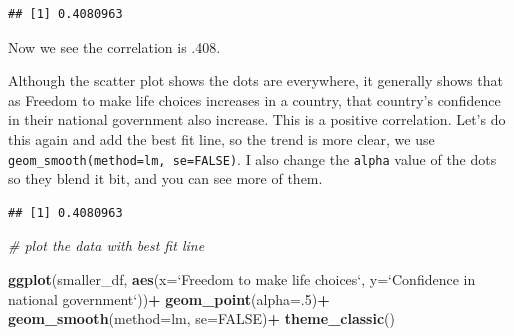 \documentclass[]{book}
\newenvironment{Shaded}{\begin{snugshade}}{\end{snugshade}}
\newcommand{\KeywordTok}[1]{\textcolor[rgb]{0.13,0.29,0.53}{\textbf{#1}}}
\newcommand{\DataTypeTok}[1]{\textcolor[rgb]{0.13,0.29,0.53}{#1}}
\newcommand{\DecValTok}[1]{\textcolor[rgb]{0.00,0.00,0.81}{#1}}
\newcommand{\StringTok}[1]{\textcolor[rgb]{0.31,0.60,0.02}{#1}}
\newcommand{\CommentTok}[1]{\textcolor[rgb]{0.56,0.35,0.01}{\textit{#1}}}
\newcommand{\OtherTok}[1]{\textcolor[rgb]{0.56,0.35,0.01}{#1}}
\newcommand{\OperatorTok}[1]{\textcolor[rgb]{0.81,0.36,0.00}{\textbf{#1}}}
\newcommand{\NormalTok}[1]{#1}
\begin{document}
\begin{verbatim}
## [1] 0.4080963
\end{verbatim}

Now we see the correlation is .408.

Although the scatter plot shows the dots are everywhere, it generally
shows that as Freedom to make life choices increases in a country, that
country's confidence in their national government also increase. This is
a positive correlation. Let's do this again and add the best fit line,
so the trend is more clear, we use
\texttt{geom\_smooth(method=lm,\ se=FALSE)}. I also change the
\texttt{alpha} value of the dots so they blend it bit, and you can see
more of them.

\begin{Shaded}
\end{Shaded}

\begin{verbatim}
## [1] 0.4080963
\end{verbatim}

\begin{Shaded}
\begin{Highlighting}[]
\CommentTok{# plot the data with best fit line}

\KeywordTok{ggplot}\NormalTok{(smaller_df, }\KeywordTok{aes}\NormalTok{(}\DataTypeTok{x=}\StringTok{`}\DataTypeTok{Freedom to make life choices}\StringTok{`}\NormalTok{,}
                     \DataTypeTok{y=}\StringTok{`}\DataTypeTok{Confidence in national government}\StringTok{`}\NormalTok{))}\OperatorTok{+}
\StringTok{  }\KeywordTok{geom_point}\NormalTok{(}\DataTypeTok{alpha=}\NormalTok{.}\DecValTok{5}\NormalTok{)}\OperatorTok{+}
\StringTok{  }\KeywordTok{geom_smooth}\NormalTok{(}\DataTypeTok{method=}\NormalTok{lm, }\DataTypeTok{se=}\OtherTok{FALSE}\NormalTok{)}\OperatorTok{+}
\StringTok{  }\KeywordTok{theme_classic}\NormalTok{()}
\end{Highlighting}
\end{Shaded}
\end{document}
